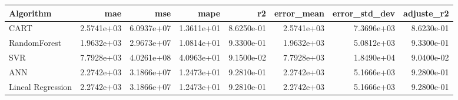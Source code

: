 \begin{tabular}{lrrrrrrr}
\toprule
Algorithm & mae & mse & mape & r2 & error_mean & error_std_dev & adjuste_r2 \\
\midrule
CART & 2.5741e+03 & 6.0937e+07 & 1.3611e+01 & 8.6250e-01 & 2.5741e+03 & 7.3696e+03 & 8.6230e-01 \\
RandomForest & 1.9632e+03 & 2.9673e+07 & 1.0814e+01 & 9.3300e-01 & 1.9632e+03 & 5.0812e+03 & 9.3300e-01 \\
SVR & 7.7928e+03 & 4.0261e+08 & 4.0963e+01 & 9.1500e-02 & 7.7928e+03 & 1.8490e+04 & 9.0400e-02 \\
ANN & 2.2742e+03 & 3.1866e+07 & 1.2473e+01 & 9.2810e-01 & 2.2742e+03 & 5.1666e+03 & 9.2800e-01 \\
Lineal Regression & 2.2742e+03 & 3.1866e+07 & 1.2473e+01 & 9.2810e-01 & 2.2742e+03 & 5.1666e+03 & 9.2800e-01 \\
\bottomrule
\end{tabular}

